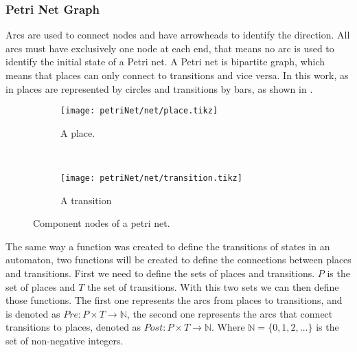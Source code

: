 \subsubsection{Petri Net Graph}
\label{sec:petrinetGraph}
Arcs are used to connect
nodes and have arrowheads to identify the direction. All arcs must have exclusively one node at each end, that means
no arc is used to identify the initial state of a Petri net. A Petri net is
bipartite graph, which means that places can only connect to transitions and vice
versa. In this work, as in \cite{david2005discrete} places are represented by
circles and transitions by bars, as shown in . 
\begin{figure}[H]
  \centering
  \begin{subfigure}[t]{0.45\textwidth}
  \centering
  \texttt{[image: petriNet/net/place.tikz]}
  \caption{A place.}
\end{subfigure}
~
\begin{subfigure}[t]{0.5\textwidth}
  \centering
  \texttt{[image: petriNet/net/transition.tikz]}
  \caption{A transition}
\end{subfigure}
\caption{Component nodes of a petri net.}
\label{fig:componentsPetriNet}
\end{figure}

The same way a function was created to define the transitions of states in an
automaton, two functions will be created to define the connections between places
and transitions. First we need to define the sets of places and transitions. $P$
is the set of places and $T$ the set of transitions. With this two sets we can
then define those functions. The first one represents the arcs
from places to transitions, and is denoted as $Pre: P \times T \rightarrow
\mathbb{N}$, the second one represents the arcs that connect transitions to places, denoted
as $Post: P \times T \rightarrow \mathbb{N}$. Where $\mathbb{N}=\{0,1,2,\dots\}$
is the set of non-negative integers.



